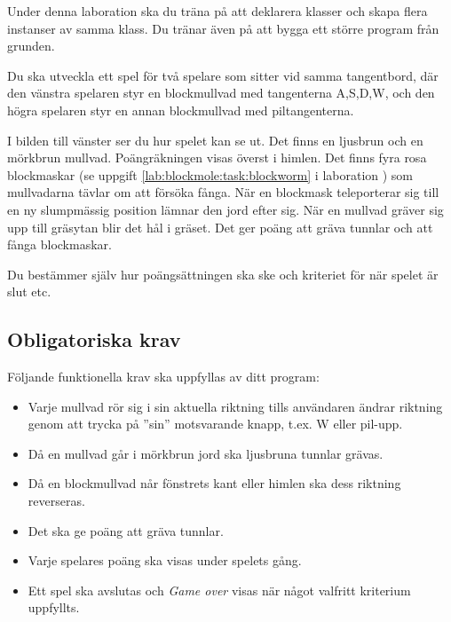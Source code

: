 {
\setlength{\currentparskip}{\parskip}%
\setlength{\currentparindent}{\parindent}%
\hfill%
\begin{minipage}{0.4\textwidth}
\setlength{\parskip}{\currentparskip}%
\setlength{\parindent}{\currentparindent}%
\noindent Under denna laboration ska du träna på att deklarera klasser och skapa flera instanser av samma klass. Du tränar även på att bygga ett större program från grunden.

Du ska utveckla ett spel för två spelare som sitter vid samma tangentbord, där den vänstra spelaren styr en blockmullvad med tangenterna A,S,D,W, och den högra spelaren styr en annan blockmullvad med piltangenterna.

I bilden till vänster ser du hur spelet kan se ut. Det finns en ljusbrun och en mörkbrun mullvad. Poängräkningen visas överst i himlen. Det finns fyra rosa blockmaskar (se uppgift \ref{lab:blockmole:task:blockworm} i laboration ) som mullvadarna tävlar om att försöka fånga. När en blockmask teleporterar sig till en ny slumpmässig position lämnar den jord efter sig. När en mullvad gräver sig upp till gräsytan blir det hål i gräset.
Det ger poäng att gräva tunnlar och att fånga blockmaskar.

Du bestämmer själv hur poängsättningen ska ske och kriteriet för när spelet är slut etc.
\end{minipage}%
}



\subsection{Obligatoriska krav}

Följande funktionella krav ska uppfyllas av ditt program:
\begin{itemize}[nosep, label={$\square$},]
\item Varje mullvad rör sig i sin aktuella riktning tills användaren ändrar riktning genom att trycka på ''sin'' motsvarande knapp, t.ex. W eller pil-upp.
\item Då en mullvad går i mörkbrun jord ska ljusbruna tunnlar grävas.
\item Då en blockmullvad når fönstrets kant eller himlen ska dess riktning reverseras.
\item Det ska ge poäng att gräva tunnlar.
\item Varje spelares poäng ska visas under spelets gång.
\item Ett spel ska avslutas och \emph{Game over} visas när något valfritt kriterium uppfyllts.
\end{itemize}

